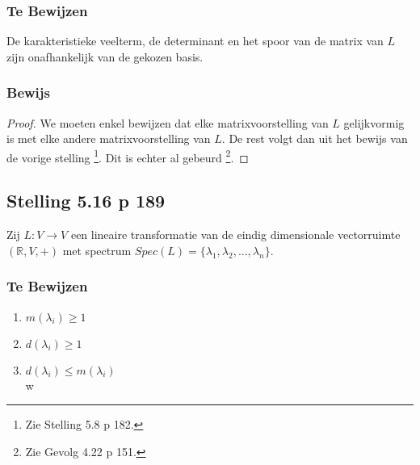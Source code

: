 \documentclass[lineaire_algebra_oplossingen.tex]{subfiles}
\begin{document}
\subsubsection*{Te Bewijzen}
De karakteristieke veelterm, de determinant en het spoor van de matrix van $L$ zijn onafhankelijk van de gekozen basis.

\subsubsection*{Bewijs}
\begin{proof}
We moeten enkel bewijzen dat elke matrixvoorstelling van $L$ gelijkvormig is met elke andere matrixvoorstelling van $L$. De rest volgt dan uit het bewijs van de vorige stelling \footnote{Zie Stelling 5.8 p 182.}. Dit is echter al gebeurd \footnote{Zie Gevolg 4.22 p 151.}.
\end{proof}


\subsection{Stelling 5.16 p 189}
\label{5.16}
Zij $L:V\rightarrow V$ een lineaire transformatie van de eindig dimensionale vectorruimte $(\mathbb{R},V,+)$ met spectrum $Spec(L) = \{\lambda_1,\lambda_2,...,\lambda_n\}$.

\subsubsection*{Te Bewijzen}
\begin{enumerate}
\item $m(\lambda_i) \ge 1$\\
\item $d(\lambda_i) \ge 1$\\
\item $d(\lambda_i) \le m(\lambda_i)$\\w
\end{enumerate}
\end{document}
